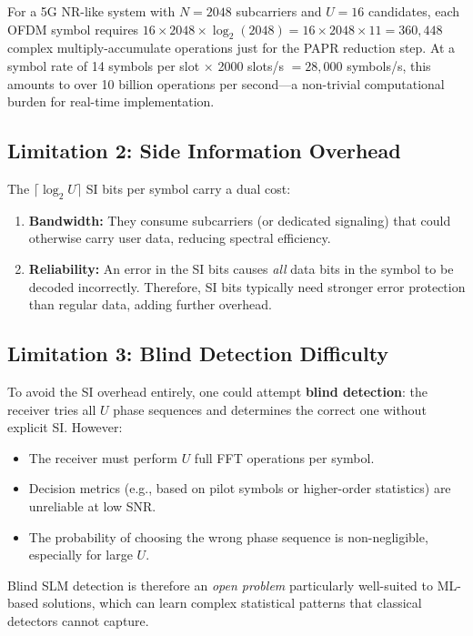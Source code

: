 \begin{workingexample}
    For a 5G NR-like system with $N=2048$ subcarriers and $U=16$ candidates, each OFDM symbol requires $16 \times 2048 \times \log_2(2048) = 16 \times 2048 \times 11 = 360{,}448$ complex multiply-accumulate operations just for the PAPR reduction step.  At a symbol rate of 14 symbols per slot $\times$ 2000 slots/s $= 28{,}000$ symbols/s, this amounts to over 10 billion operations per second---a non-trivial computational burden for real-time implementation.
\end{workingexample}

\subsection{Limitation 2: Side Information Overhead}

The $\lceil\log_2 U\rceil$ SI bits per symbol carry a dual cost:
\begin{enumerate}
    \item \textbf{Bandwidth:} They consume subcarriers (or dedicated signaling) that could otherwise carry user data, reducing spectral efficiency.
    \item \textbf{Reliability:} An error in the SI bits causes \emph{all} data bits in the symbol to be decoded incorrectly. Therefore, SI bits typically need stronger error protection than regular data, adding further overhead.
\end{enumerate}

\subsection{Limitation 3: Blind Detection Difficulty}

To avoid the SI overhead entirely, one could attempt \textbf{blind detection}: the receiver tries all $U$ phase sequences and determines the correct one without explicit SI.  However:
\begin{itemize}
    \item The receiver must perform $U$ full FFT operations per symbol.
    \item Decision metrics (e.g., based on pilot symbols or higher-order statistics) are unreliable at low SNR.
    \item The probability of choosing the wrong phase sequence is non-negligible, especially for large $U$.
\end{itemize}

Blind SLM detection is therefore an \emph{open problem} particularly well-suited to ML-based solutions, which can learn complex statistical patterns that classical detectors cannot capture.


